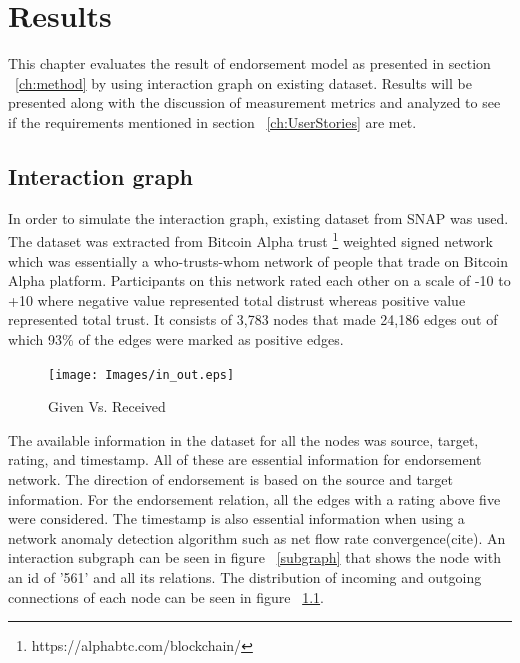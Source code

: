 \chapter{Results} \label{ch:results}
This chapter evaluates the result of endorsement model as presented in section
~\ref{ch:method} by using interaction graph on existing dataset. Results will
be presented along with the discussion of measurement metrics and analyzed to
see if the requirements mentioned in section ~\ref{ch:UserStories} are met.  

\section{Interaction graph}
In order to simulate the interaction graph, existing dataset from SNAP
\cite{snapnets} was used. The dataset was extracted from Bitcoin Alpha trust
\footnote{https://alphabtc.com/blockchain/}
weighted signed network which was essentially a who-trusts-whom network of
people that trade on Bitcoin Alpha platform. Participants on this network rated
each other on a scale of -10 to +10 where negative value represented total
distrust whereas positive value represented total trust. It consists of 3,783
nodes that made 24,186 edges out of which 93\% of the edges were marked as
positive edges\cite{kumar2016edge}. 

\begin{figure}[h]
	\texttt{[image: Images/in\_out.eps]}
	\caption{Given Vs. Received}
	\label{inOut}
\end{figure}

The available information in the dataset for all the nodes was source, target,
rating, and timestamp. All of these are essential information for endorsement
network. The direction of endorsement is based on the source and target
information. For the endorsement relation, all the edges with a rating above
five were considered. The timestamp is also essential information when using a
network anomaly detection algorithm such as net flow rate convergence(cite). An
interaction subgraph can be seen in figure ~\ref{subgraph} that shows the node
with an id of '561' and all its relations. The distribution of incoming and
outgoing connections of each node can be seen in figure ~\ref{inOut}. 

